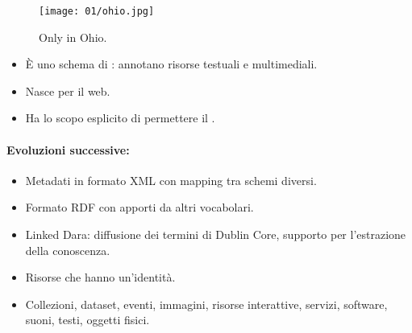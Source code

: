 

\begin{figure}[h]
    \centering
    \texttt{[image: 01/ohio.jpg]}
    \caption{Only in Ohio.}
\end{figure}


\begin{itemize}
  \item È uno schema di : annotano risorse testuali e multimediali. 
  \item Nasce per il web. 
  \item Ha lo scopo esplicito di permettere il .
\end{itemize}

\paragraph{Evoluzioni successive:}

\begin{itemize}
  \item Metadati in formato XML con mapping tra schemi diversi. 
  \item Formato RDF con apporti da altri vocabolari. 
  \item Linked Dara: diffusione dei termini di Dublin Core, supporto per l'estrazione della conoscenza.
\end{itemize}


\begin{itemize}
  \item Risorse che hanno un'identità. 
  \item Collezioni, dataset, eventi, immagini, risorse interattive, servizi, software, suoni, testi, oggetti fisici.
\end{itemize}

